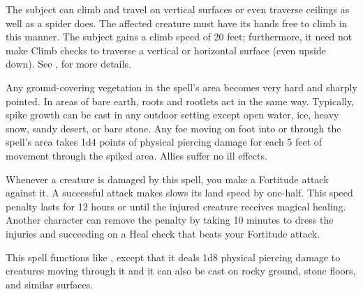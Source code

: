 \spelldur{\durmed}
\begin{spelleffect}
    The subject can climb and travel on vertical surfaces or even traverse ceilings as well as a spider does. The affected creature must have its hands free to climb in this manner. The subject gains a climb speed of 20 feet; furthermore, it need not make Climb checks to traverse a vertical or horizontal surface (even upside down). See , for more details.
\end{spelleffect}

\spelldur{\durshort \dismissable}
\begin{spelleffect}
    Any ground-covering vegetation in the spell's area becomes very hard and sharply pointed. In areas of bare earth, roots and rootlets act in the same way. Typically, spike growth can be cast in any outdoor setting except open water, ice, heavy snow, sandy desert, or bare stone. Any foe moving on foot into or through the spell's area takes 1d4 points of physical piercing damage for each 5 feet of movement through the spiked area. Allies suffer no ill effects.

    Whenever a creature is damaged by this spell, you make a Fortitude attack against it. A successful attack makes slows its land speed by one-half. This speed penalty lasts for 12 hours or until the injured creature receives magical healing. Another character can remove the penalty by taking 10 minutes to dress the injuries and succeeding on a Heal check that beats your Fortitude attack.
\end{spelleffect}

\begin{spelleffect}
    This spell functions like , except that it deals 1d8 physical piercing damage to creatures moving through it and it can also be cast on rocky ground, stone floors, and similar surfaces.
\end{spelleffect}

